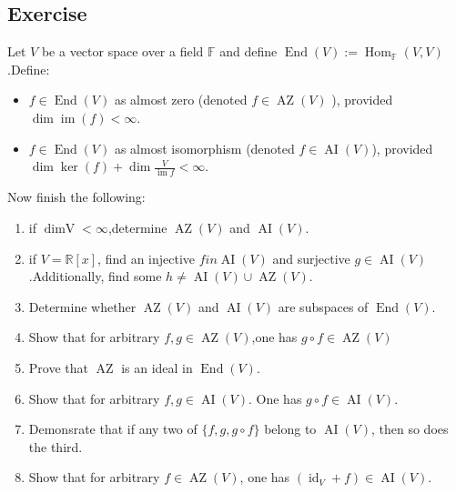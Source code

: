 \documentclass[11pt]{ctexart}
\theoremstyle{definition}
\numberwithin{equation}{section}
\newcommand{\op}[1]{\operatorname{#1}}%
\newcommand{\FF}{\mathbb{F}}%
\newcommand{\RR}{\mathbb{R}}
\theoremstyle{definition}
\theoremstyle{remark}
\begin{document}
\subsection{Exercise}
Let $V$ be a vector space over a field $\FF$ and define  $\op{End}(V):= \op{Hom}_{\FF}(V,V)$.Define:
\begin{itemize}
    \item $f \in \op{End}(V)$ as almost zero (denoted $f\in \op{AZ}(V)$ ), provided $\op{dim}\op{im}(f)<\infty$.
    \item $f\in \op{End}(V)$ as almost isomorphism (denoted $f\in \op{AI}(V)$), provided $\op{dim}\op{ker}(f)+\op{dim}\frac{V}{\op{im}f}<\infty$.
\end{itemize}
Now finish the following:
\begin{enumerate}
    \item if $\op{dim V}< \infty$,determine $\op{AZ}(V)$ and $\op{AI}(V)$.
    \item if $V=\RR[x]$, find an injective $f in \op{AI}(V)$ and surjective $g\in \op{AI}(V)$.Additionally, find some $h\neq \op{AI}(V)\cup \op{AZ}(V)$.
    \item Determine whether $\op{AZ}(V)$ and $\op{AI}(V)$ are subspaces of $\op{End}(V)$.
    \item Show that for arbitrary $f,g \in \op{AZ}(V)$,one has $g\circ f\in \op{AZ}(V)$
    \item Prove that $\op{AZ}$ is an ideal in $\op{End}(V)$.
    \item Show that for arbitrary $f,g\in \op{AI}(V)$. One has $g\circ f\in \op{AI}(V)$.
    \item Demonsrate that if any two of $\{f,g, g\circ f\}$ belong to $\op{AI}(V)$, then so does the third.
    \item Show that for arbitrary $f\in \op{AZ}(V)$, one has $(\op{id}_V+f)\in \op{AI}(V)$.
\end{enumerate}
\end{document}
